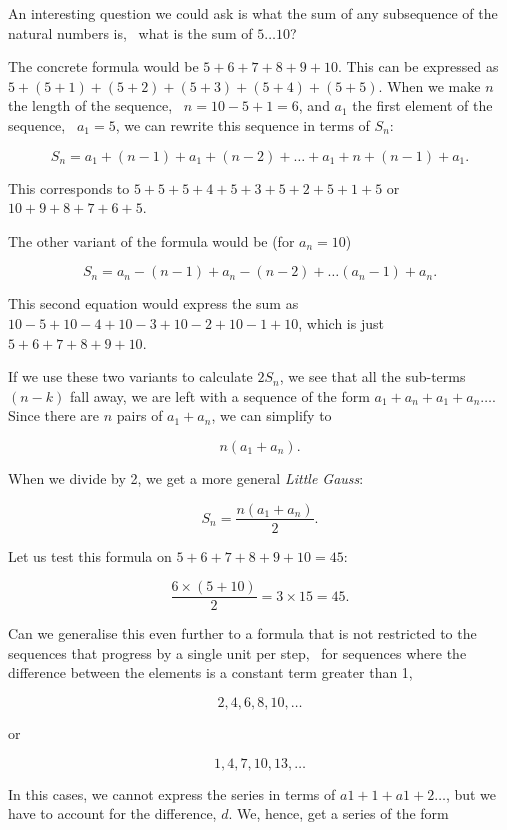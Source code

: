 \documentclass{scrreprt}
\begin{document}
An interesting question we could ask is what the sum of
any subsequence of the natural numbers is, \eg\ what is the sum of
$5\dots 10$?

The concrete formula would be
$5+6+7+8+9+10$.
This can be expressed as
$5 + (5+1) + (5+2) + (5+3) + (5+4) + (5+5)$. 
When we make $n$ the length of the sequence, \ie\ $n=10-5+1=6$,
and $a_1$ the first element of the sequence, \ie\ $a_1=5$,
we can rewrite this sequence in terms of $S_n$:

\begin{equation}
S_n = a_1 + (n-1) + a_1 + (n-2) + \dots + a_1 + n+(n-1) + a_1.
\end{equation}

This corresponds to $5 + 5 + 5 + 4 + 5 + 3 + 5 + 2 + 5 + 1 + 5$ or
$10 + 9 + 8 + 7 + 6 + 5$.

The other variant of the formula would be (for $a_n=10$)

\begin{equation}
S_n = a_n - (n - 1) + a_n - (n-2) + \dots (a_n -1) + a_n.
\end{equation}

This second equation would express the sum as
$10 - 5 + 10 - 4 + 10 - 3 + 10 - 2 + 10 -1 + 10$, which is
just $5 + 6 + 7 + 8 + 9 + 10$.

If we use these two variants to calculate $2S_n$, we see
that all the sub-terms $(n-k)$ fall away, we are left with
a sequence of the form $a_1 + a_n + a_1 + a_n\dots$.
Since there are $n$ pairs of $a_1 + a_n$, we can simplify
to

\[
n(a_1 + a_n).
\]

When we divide by 2, we get a more general \emph{Little Gauss}:

\begin{equation}
S_n = \frac{n(a_1 + a_n)}{2}.
\end{equation}

Let us test this formula on $5+6+7+8+9+10 = 45$:

\[
\frac{6\times (5+10)}{2} = 3\times 15 = 45.
\]

Can we generalise this even further to a formula
that is not restricted to the sequences that progress
by a single unit per step, \ie\ for sequences
where the difference between the elements is a constant
term greater than 1, \eg\:

\[
2, 4, 6, 8, 10, \dots
\]

or

\[
1, 4, 7, 10, 13, \dots
\]

In this cases, we cannot express the series in terms of
$a1 + 1 + a1 + 2\dots$, but we have to account for the
difference, $d$. We, hence, get a series of the form
\end{document}

